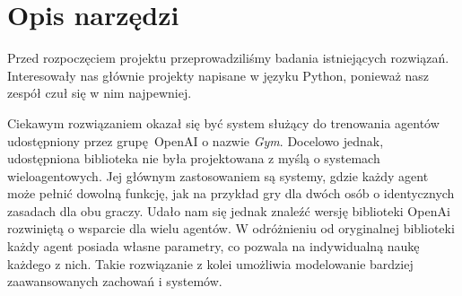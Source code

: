 \section{Opis narzędzi}
Przed rozpoczęciem projektu przeprowadziliśmy badania
istniejących rozwiązań. Interesowały nas głównie projekty
napisane w języku Python, ponieważ nasz zespół czuł się w nim
najpewniej.

Ciekawym rozwiązaniem okazał się być system służący do 
trenowania agentów udostępniony przez grupę OpenAI o nazwie
\textit{Gym}\cite{openai_gym}. Docelowo jednak, udostępniona biblioteka
nie była projektowana z myślą o systemach wieloagentowych. Jej głównym zastosowaniem
są systemy, gdzie każdy agent może pełnić dowolną funkcję, jak na przykład gry dla dwóch
osób o identycznych zasadach dla obu graczy.
Udało nam się jednak znaleźć wersję biblioteki OpenAi rozwiniętą
o wsparcie dla wielu agentów\cite{ma_gym}. W odróżnieniu od oryginalnej biblioteki
każdy agent posiada własne parametry, co pozwala na indywidualną naukę każdego z nich.
Takie rozwiązanie z kolei umożliwia modelowanie bardziej zaawansowanych zachowań i systemów.
